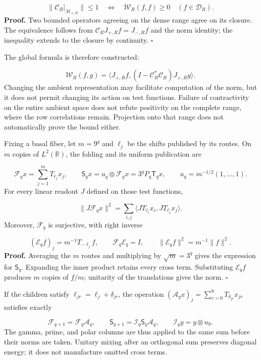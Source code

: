 \[
\|\mathcal C_R|_{\mathcal M_{+,R}}\|\leq1
\quad\Longleftrightarrow\quad
\mathscr W_R(f,f)\geq0\quad(f\in\mathcal D_R).
\]
\textbf{Proof.} Two bounded operators agreeing on the dense range agree on its closure. The equivalence follows from \(\mathcal C_RJ_{+,R}f=J_{-,R}f\) and the norm identity; the inequality extends to the closure by continuity. \hfill\(\square\)

The global formula is therefore constructed:

\[
\mathscr W_R(f,g)=
\langle J_{+,R}f,(I-\mathcal C_R^*\mathcal C_R)J_{+,R}g\rangle.
\]
Changing the ambient representation may facilitate computation of the norm, but it does not permit changing its action on test functions. Failure of contractivity on the entire ambient space does not refute positivity on the complete range, where the row correlations remain. Projection onto that range does not automatically prove the bound either.

Fixing a basal fiber, let \(m=9^q\) and \(\ell_j\) be the shifts published by its routes. On \(m\) copies of \(L^2(\mathbb R)\), the folding and its uniform publication are

\[
\mathcal F_qx=\sum_{j=1}^mT_{\ell_j}x_j,\qquad
\mathsf S_qx=u_q\otimes\mathcal F_qx=3^qP_q\mathsf T_qx,
\qquad u_q=m^{-1/2}(1,\ldots,1).
\]
For every linear readout \(J\) defined on those test functions,

\[
\|J\mathcal F_qx\|^2
=\sum_{i,j}\langle JT_{\ell_i}x_i,JT_{\ell_j}x_j\rangle.
\]
Moreover, \(\mathcal F_q\) is surjective, with right inverse

\[
(\mathcal E_qf)_j=m^{-1}T_{-\ell_j}f,\qquad
\mathcal F_q\mathcal E_q=I,\qquad
\|\mathcal E_qf\|^2=m^{-1}\|f\|^2.
\]
\textbf{Proof.} Averaging the \(m\) routes and multiplying by \(\sqrt m=3^q\) gives the expression for \(\mathsf S_q\). Expanding the inner product retains every cross term. Substituting \(\mathcal E_qf\) produces \(m\) copies of \(f/m\); unitarity of the translations gives the norm. \hfill\(\square\)

If the children satisfy \(\ell_{jr}=\ell_j+\delta_{jr}\), the operation \((\mathcal A_qx)_j=\sum_{r=0}^8T_{\delta_{jr}}x_{jr}\) satisfies exactly

\[
\mathcal F_{q+1}=\mathcal F_q\mathcal A_q,\qquad
\mathsf S_{q+1}=\mathcal I_q\mathsf S_q\mathcal A_q,\qquad
\mathcal I_qy=y\otimes u_9.
\]
The gamma, prime, and polar columns are thus applied to the same sum before their norms are taken. Unitary mixing after an orthogonal sum preserves diagonal energy; it does not manufacture omitted cross terms.

